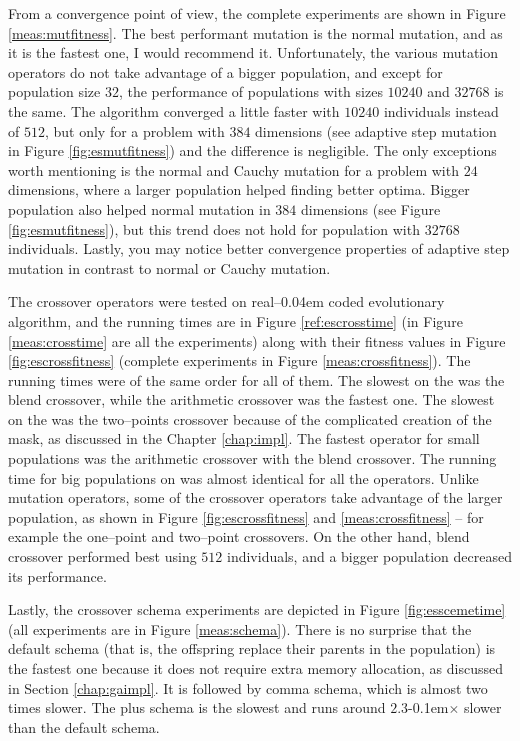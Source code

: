 From a convergence point of view, the complete experiments are shown in Figure \ref{meas:mutfitness}. The best performant mutation is the normal mutation, and as it is the fastest one, I would recommend it. Unfortunately, the various mutation operators do not take advantage of a bigger population, and except for population size $32$, the performance of populations with sizes $10240$ and $32768$ is the same. The algorithm converged a little faster with $10240$ individuals instead of $512$, but only for a problem with $384$ dimensions (see adaptive step mutation in Figure \ref{fig:esmutfitness}) and the difference is negligible. The only exceptions worth mentioning is the normal and Cauchy mutation for a problem with $24$ dimensions, where a larger population helped finding better optima. Bigger population also helped normal mutation in $384$ dimensions (see Figure \ref{fig:esmutfitness}), but this trend does not hold for population with $32768$ individuals. Lastly, you may notice better convergence properties of adaptive step mutation in contrast to normal or Cauchy mutation.

The crossover operators were tested on real--\kern0.04em coded evolutionary algorithm, and the running times are in Figure \ref{ref:escrosstime} (in Figure \ref{meas:crosstime} are all the experiments) along with their fitness values in Figure \ref{fig:escrossfitness} (complete experiments in Figure \ref{meas:crossfitness}). The running times were of the same order for all of them. The slowest on the \cpu was the blend crossover, while the arithmetic crossover was the fastest one. The slowest on the \gpu was the two--points crossover because of the complicated creation of the mask, as discussed in the Chapter \ref{chap:impl}. The fastest operator for small populations was the arithmetic crossover with the blend crossover. The running time for big populations on \gpu was almost identical for all the operators. Unlike mutation operators, some of the crossover operators take advantage of the larger population, as shown in Figure \ref{fig:escrossfitness} and \ref{meas:crossfitness} -- for example the one--point and two--point crossovers. On the other hand, blend crossover performed best using $512$ individuals, and a bigger population decreased its performance.

Lastly, the crossover schema experiments are depicted in Figure \ref{fig:esscemetime} (all experiments are in Figure \ref{meas:schema}). There is no surprise that the default schema (that is, the offspring replace their parents in the population) is the fastest one because it does not require extra memory allocation, as discussed in Section \ref{chap:gaimpl}. It is followed by comma schema, which is almost two times slower. The plus schema is the slowest and runs around $2.3$\kern-0.1em$\times$ slower than the default schema.

